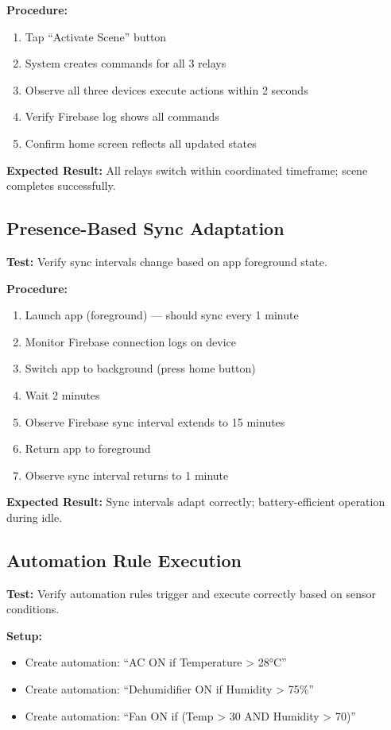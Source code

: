 \textbf{Procedure:}
\begin{enumerate}
    \item Tap ``Activate Scene'' button
    \item System creates commands for all 3 relays
    \item Observe all three devices execute actions within 2 seconds
    \item Verify Firebase log shows all commands
    \item Confirm home screen reflects all updated states
\end{enumerate}

\textbf{Expected Result:} All relays switch within coordinated timeframe; scene completes successfully.

\subsection{Presence-Based Sync Adaptation}

\textbf{Test:} Verify sync intervals change based on app foreground state.

\textbf{Procedure:}
\begin{enumerate}
    \item Launch app (foreground) — should sync every 1 minute
    \item Monitor Firebase connection logs on device
    \item Switch app to background (press home button)
    \item Wait 2 minutes
    \item Observe Firebase sync interval extends to 15 minutes
    \item Return app to foreground
    \item Observe sync interval returns to 1 minute
\end{enumerate}

\textbf{Expected Result:} Sync intervals adapt correctly; battery-efficient operation during idle.

\subsection{Automation Rule Execution}

\textbf{Test:} Verify automation rules trigger and execute correctly based on sensor conditions.

\textbf{Setup:}
\begin{itemize}
    \item Create automation: ``AC ON if Temperature > 28°C''
    \item Create automation: ``Dehumidifier ON if Humidity > 75\%''
    \item Create automation: ``Fan ON if (Temp > 30 AND Humidity > 70)''
\end{itemize}

